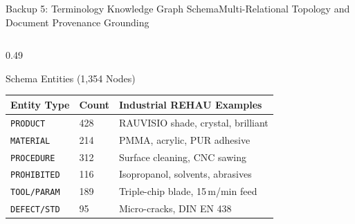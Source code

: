 \documentclass[aspectratio=169,10pt]{beamer}
\begin{document}
\begin{frame}{Backup 5: Terminology Knowledge Graph Schema}{Multi-Relational Topology and Document Provenance Grounding}
{\par
  }
  \vspace{0.6ex}

  \begin{columns}[T]
    \begin{column}{0.49\textwidth}
      \begin{block}{Schema Entities (1,354 Nodes)}
        \centering\scriptsize
        \renewcommand{\arraystretch}{0.80}
        \setlength{\tabcolsep}{2.5pt}
        \begin{tabular}{@{}llp{4.2cm}@{}}
          \toprule
          \textbf{Entity Type} & \textbf{Count} & \textbf{Industrial REHAU Examples} \\
          \midrule
          \texttt{PRODUCT} & 428 & RAUVISIO shade, crystal, brilliant \\
          \texttt{MATERIAL} & 214 & PMMA, acrylic, PUR adhesive \\
          \texttt{PROCEDURE} & 312 & Surface cleaning, CNC sawing \\
          \texttt{PROHIBITED} & 116 & Isopropanol, solvents, abrasives \\
          \texttt{TOOL/PARAM} & 189 & Triple-chip blade, 15\,m/min feed \\
          \texttt{DEFECT/STD} & 95 & Micro-cracks, DIN EN 438 \\
          \bottomrule
        \end{tabular}
      \end{block}
    \end{column}


\end{columns}
\end{frame}
\end{document}
